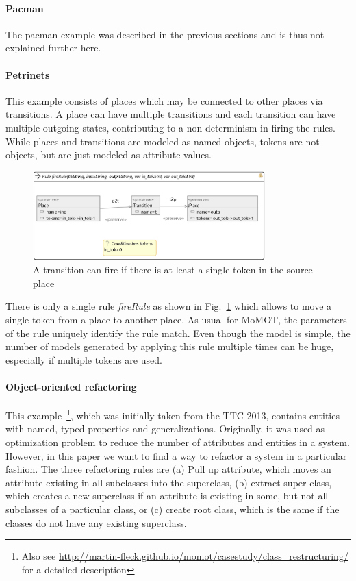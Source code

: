 \paragraph{Pacman} The pacman example was described in the previous sections and is thus not explained further here.


\paragraph{Petrinets} 
This example consists of places which may be connected to other places via transitions. A place can have multiple transitions
and each transition can have multiple outgoing states, contributing to a non-determinism in firing the rules.
While places and transitions are modeled as named objects, tokens are not objects, but are just modeled as attribute values.


\begin{figure}
\includegraphics[width=0.8\textwidth]{images/firetransition.png}
\caption{A transition can fire if there is at least a single token in the source place}
\label{fig:firerule}
\end{figure}

There is only a single rule \textit{fireRule} as shown in Fig.~\ref{fig:firerule} which allows to move a single token from a place to another place. 
As usual for MoMOT, the parameters of the rule uniquely identify the rule match. Even though the model is simple, the number of models generated
by applying this rule multiple times can be huge, especially if multiple tokens are used.

\paragraph{Object-oriented refactoring}

This example~\footnote{Also see \url{http://martin-fleck.github.io/momot/casestudy/class_restructuring/} for a detailed description}, which was initially taken from the TTC 2013, contains entities with named, typed properties and generalizations. 
Originally, it was used as optimization problem to reduce the number of attributes and entities in a system. However, in this paper
we want to find a way to refactor a system in a particular fashion. The three refactoring rules are (a) Pull up attribute, which moves an attribute existing in all subclasses into the superclass, (b) extract super class, which creates a new superclass if an attribute is existing in some, but not all subclasses of a particular class, or (c) create root class, which is the same if the classes do not have any existing superclass.

